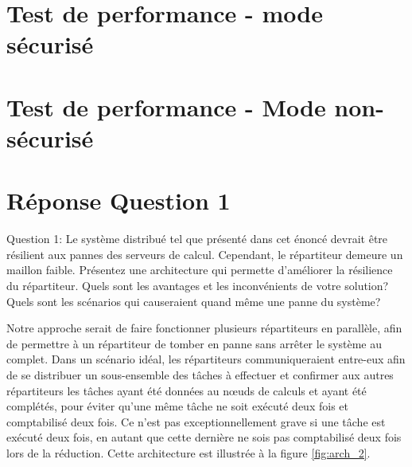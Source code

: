 \section{Test de performance - mode sécurisé}

\section{Test de performance - Mode non-sécurisé}

\section{Réponse Question 1}
Question 1: Le système distribué tel que présenté dans cet énoncé devrait être résilient aux pannes
des serveurs de calcul. Cependant, le répartiteur demeure un maillon faible. Présentez une
architecture qui permette d'améliorer la résilience du répartiteur. Quels sont les avantages et les
inconvénients de votre solution? Quels sont les scénarios qui causeraient quand même une panne du
système?

Notre approche serait de faire fonctionner plusieurs répartiteurs en parallèle, afin de permettre à 
un répartiteur de tomber en panne sans arrêter le système au complet. Dans un scénario idéal, les répartiteurs 
communiqueraient entre-eux afin de se distribuer un sous-ensemble des tâches à effectuer et confirmer aux autres répartiteurs 
les tâches ayant été données au nœuds de calculs et ayant été complétés, pour éviter qu'une même tâche ne soit exécuté deux fois
et comptabilisé deux fois. Ce n'est pas exceptionnellement grave si une tâche est exécuté deux fois, en autant que cette dernière ne sois 
pas comptabilisé deux fois lors de la réduction. Cette architecture est illustrée à la figure  \ref{fig:arch_2}.

